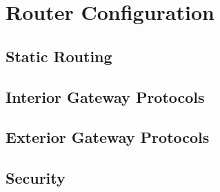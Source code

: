 \chapter{Router Configuration}
\section{Static Routing}
\section{Interior Gateway Protocols}
\section{Exterior Gateway Protocols}
\section{Security}

